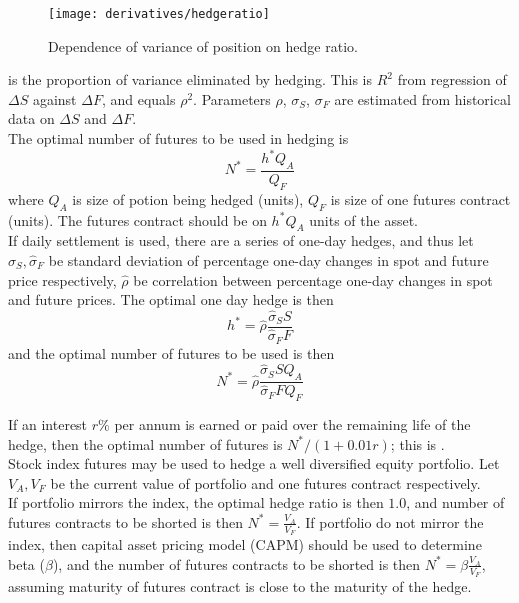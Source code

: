 \begin{figure}[H]
\centering
\texttt{[image: derivatives/hedgeratio]}
\caption{Dependence of variance of position on hedge ratio.}
\end{figure}

 is the proportion of variance eliminated by hedging. This is $R^2$ from regression of $\Delta S$ against $\Delta F$, and equals $\rho^2$. Parameters $\rho$, $\sigma_S$, $\sigma_F$ are estimated from historical data on $\Delta S$ and $\Delta F$.\\

The optimal number of futures to be used in hedging is
\begin{equation}
N^* = \frac{h^* Q_A}{Q_F} \nonumber
\end{equation}
where $Q_A$ is size of potion being hedged (units), $Q_F$ is size of one futures contract (units). The futures contract should be on $h^* Q_A$ units of the asset.\\

If daily settlement is used, there are a series of one-day hedges, and thus let $\hat{\sigma}_S, \hat{\sigma}_F$ be standard deviation of percentage one-day changes in spot and future price respectively, $\hat{\rho}$ be correlation between percentage one-day changes in spot and future prices. The optimal one day hedge is then
\begin{equation}
h^* = \hat{\rho}\frac{\hat{\sigma}_S S}{\hat{\sigma}_F F} \nonumber
\end{equation} 
and the optimal number of futures to be used is then
\begin{equation}
N^* = \hat{\rho}\frac{\hat{\sigma}_S S Q_A}{\hat{\sigma}_F F Q_F} \nonumber
\end{equation}

If an interest $r\%$ per annum is earned or paid over the remaining life of the hedge, then the optimal number of futures is $N^* / (1+0.01r)$; this is .\\

Stock index futures may be used to hedge a well diversified equity portfolio. Let $V_A, V_F$ be the current value of portfolio and one futures contract respectively.\\
If portfolio mirrors the index, the optimal hedge ratio is then $1.0$, and number of futures contracts to be shorted is then $N^* = \frac{V_A}{V_F}$. If portfolio do not mirror the index, then capital asset pricing model (CAPM) should be used to determine beta ($\beta$), and the number of futures contracts to be shorted is then $N^* = \beta \frac{V_A}{V_F}$, assuming maturity of futures contract is close to the maturity of the hedge.\\

